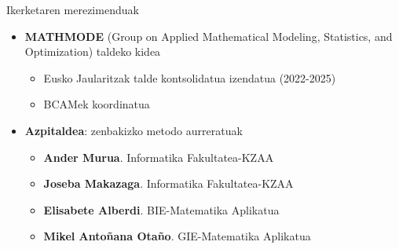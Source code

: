 \documentclass[
 10pt,%
 compress,%
 t,       %
 xcolor=svgnames
]{beamer}
\theoremstyle{definition} \newtheorem{definicion}{Definicion}[section]
\theoremstyle{propiedades} \newtheorem{propiedades}{Propiedades}[section]
\begin{document}
\begin{frame}{Ikerketaren merezimenduak} 					  

\medskip
\small

\begin{itemize}
\item \textbf{MATHMODE}  (Group on Applied Mathematical Modeling, Statistics, and Optimization) taldeko kidea
%

\begin{itemize}
\item Eusko Jaularitzak talde kontsolidatua izendatua (2022-2025)
\item BCAMek koordinatua
\end{itemize}
%
\medskip
\item 
\textbf{Azpitaldea}: zenbakizko metodo aurreratuak
%
%
\medskip


\small
\begin{itemize}
\item \textbf{Ander Murua}. Informatika Fakultatea-KZAA %
%
\item \textbf{Joseba Makazaga}. Informatika Fakultatea-KZAA%
%
\item \textbf{Elisabete Alberdi}. BIE-Matematika Aplikatua %

 
%
%
\item \textbf{Mikel Antoñana Otaño}. GIE-Matematika Aplikatua %
\end{itemize}

\end{itemize}



\end{frame}
\end{document}
